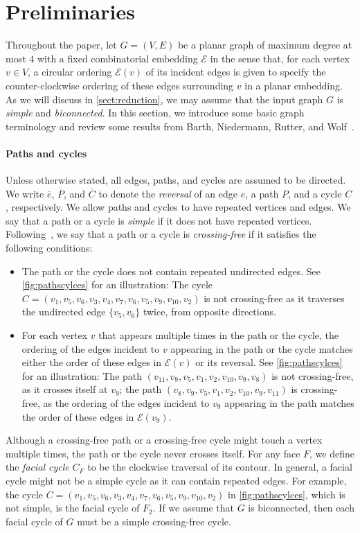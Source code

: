\documentclass{article}\usepackage[a4paper,margin=20mm]{geometry}
\newcommand{\EE}{\mathcal{E}}
\begin{document}
\section{Preliminaries}\label{sect:prelim}

Throughout the paper, let $G=(V,E)$ be a planar graph of maximum degree at most $4$ with a fixed combinatorial embedding $\EE$ in the sense that, for each vertex $v \in V$, a circular ordering $\EE(v)$ of its incident edges is given to specify the counter-clockwise ordering of these edges surrounding $v$ in a planar embedding. As we will discuss in \cref{sect:reduction}, we may assume that the input graph $G$ is \emph{simple} and \emph{biconnected}. 
In this section, we introduce some basic graph terminology and review some results from Barth, Niedermann, Rutter, and Wolf~\cite{barth2023topology}.


\paragraph{Paths and cycles} Unless otherwise stated, all edges, paths, and cycles are assumed to be directed. We write $\overline{e}$, $\overline{P}$, and $\overline{C}$ to denote the \emph{reversal} of an edge $e$, a path $P$, and a cycle $C$, respectively. We allow paths and cycles to have repeated vertices and edges. We say that a path or a cycle is \emph{simple} if it does not have repeated vertices.
Following~\cite{barth2023topology}, we say that a path or a cycle is \emph{crossing-free} if it satisfies the following conditions:
\begin{itemize}
    \item The path or the cycle does not contain repeated undirected edges. See \cref{fig:pathscylces} for an illustration: The cycle $C = (v_1, v_5, v_6, v_3, v_4, v_7, v_6, v_5, v_9, v_{10}, v_2)$ is not crossing-free as it traverses the undirected edge $\{v_5, v_6\}$ twice, from opposite directions.
    \item For each vertex $v$ that appears multiple times in the path or the cycle, the ordering of the edges incident to $v$ appearing in the path or the cycle matches either the order of these edges in $\EE(v)$ or its reversal. See \cref{fig:pathscylces} for an illustration: The path $(v_{11}, v_9, v_5, v_1, v_2, v_{10}, v_9, v_8)$ is not crossing-free, as it crosses itself at $v_9$; the path $(v_{8}, v_9, v_5, v_1, v_2, v_{10}, v_9, v_{11})$ is crossing-free, as the ordering of the edges incident to $v_9$ appearing in the path matches the order of these edges in $\EE(v_9)$.
\end{itemize}
 Although a crossing-free path or a crossing-free cycle might touch a vertex multiple times, the path or the cycle never crosses itself.
For any face $F$, we define the \emph{facial cycle} $C_F$ to be the clockwise traversal of its contour. 
In general, a facial cycle might not be a simple cycle as it can contain repeated edges. For example, the cycle $C = (v_1, v_5, v_6, v_3, v_4, v_7, v_6, v_5, v_9, v_{10}, v_2)$ in \cref{fig:pathscylces}, which is not simple, is the facial cycle of $F_2$.
If we assume that $G$ is biconnected, then each facial cycle of $G$ must be a simple crossing-free cycle. 
\end{document}
